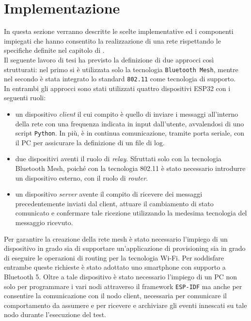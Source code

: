 \chapter{Implementazione}
\label{ch:implementazione}

In questa sezione verranno descritte le scelte implementative ed i componenti impiegati che hanno consentito la realizzazione di una rete rispettando le specifiche definite nel capitolo di \textit{}.\\ 
Il seguente lavoro di tesi ha previsto la definizione di due approcci così strutturati: nel primo si è utilizzata solo la tecnologia \texttt{Bluetooth Mesh}, mentre nel secondo è stata integrato lo standard \texttt{802.11} come tecnologia di supporto.\\
In entrambi gli approcci sono stati utilizzati quattro dispositivi ESP32 con i seguenti ruoli: 

\begin{itemize}
    \item un dispositivo \textit{client} il cui compito è quello di inviare i messaggi all'interno della rete con una frequenza indicata in input dall'utente, avvalendosi di uno script \texttt{Python}. In più, è in continua comunicazione, tramite porta seriale, con il PC per assicurare la definizione di un file di log. 
    
    \item due dispositivi aventi il ruolo di \textit{relay}. Sfruttati solo con la tecnologia Bluetooth Mesh, poiché con la tecnologia 802.11 è stato necessario introdurre un dispositivo esterno, con il ruolo di \textit{router}.
    
    \item un dispositivo \textit{server} avente il compito di ricevere dei messaggi precedentemente inviati dal client, attuare il cambiamento di stato comunicato e confermare tale ricezione utilizzando la medesima tecnologia del messaggio ricevuto.
\end{itemize}

\noindent Per garantire la creazione della rete mesh è stato necessario l'impiego di un dispositivo in grado sia di supportare un'applicazione di provisioning sia in grado di eseguire le operazioni di routing per la tecnologia Wi-Fi. Per soddisfare entrambe queste richieste è stato adottato uno smartphone con supporto a Bluetooth 5. Oltre a tale dispositivo è stato necessario l'impiego di un PC non solo per programmare i vari nodi attraverso il framework \texttt{ESP-IDF} ma anche per consentire la comunicazione con il nodo client, necessaria per comunicare il comportamento da assumere e per ricevere e archiviare gli eventi innescati su tale nodo durante l'esecuzione del test.

